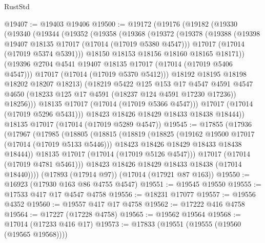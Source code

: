 \begin{lexlean}{RustStd}
\begin{coremodule}
@19407 := @19403 @19406
@19500 := @19172
    (@19176
      (@19182
        (@19330
          (@19340
            (@19344
              (@19352
                (@19358
                  (@19368
                    (@19372
                      (@19378
                        (@19388
                          (@19398 @19407 @18135 @17017 (@17014 (@17019 @5380 @4547)))
                          @17017
                          (@17014 (@17019 @5374 @5391)))
                        @18150
                        @18153
                        @18156
                        @18160
                        @18165
                        @18171))
                    (@19396 @2704 @4541 @19407 @18135 @17017 (@17014 (@17019 @5406 @4547)))
                    @17017
                    (@17014 (@17019 @5370 @5412)))
                  @18192
                  @18195
                  @18198
                  @18202
                  @18207
                  @18213)
                (@18219
                  @5422
                  @125
                  @153
                  @17
                  @4547
                  @4591
                  @4547
                  @4650
                  (@18233 @125 @17 @4591 (@18237 @124 @4591 @17230 @17236))
                  @18256)))
            @18135
            @17017
            (@17014 (@17019 @5366 @4547)))
          @17017
          (@17014 (@17019 @5296 @5431)))
        @18423
        @18426
        @18429
        @18433
        @18438
        @18444))
    @18135
    @17017
    (@17014 (@17019 @5289 @4547))
@19545 := @17855
    (@17936
      (@17967
        (@17985
          (@18805
            (@18815
              (@18819
                (@18825
                  (@19162 @19500 @17017 (@17014 (@17019 @5133 @5446)))
                  @18423
                  @18426
                  @18429
                  @18433
                  @18438
                  @18444))
              @18135
              @17017
              (@17014 (@17019 @5126 @4547)))
            @17017
            (@17014 (@17019 @4781 @5461)))
          @18423
          @18426
          @18429
          @18433
          @18438
          (@17014 @18440))))
    (@17893 (@17914 @97))
    (@17014 (@17921 @87 @163))
@19550 := @16923 (@17930 @163 @86 @4755 @4547)
@19551 := @19545 @19550
@19555 := @17533 @417 @17 @4547 @4758
@19556 := @18231 @17077
@19557 := @19556 @4352
@19560 := @19557 @417 @17 @4758
@19562 := @17222 @416 @4758
@19564 := @17227 (@17228 @4758)
@19565 := @19562 @19564
@19568 := @17014 (@17233 @416 @17)
@19573 := @17833 (@19551 (@19555 (@19560 (@19565 @19568))))

\end{coremodule}
\end{lexlean}
